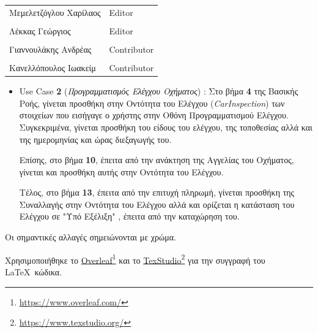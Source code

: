 \documentclass{../ol-softwaremanual}
\newcommand{\doclink}[2]{\href{#1}{#2}\footnote{\url{#1}}}
\begin{document}
	
	\vspace{20pt}
	
	\begin{table}[htbp!]
		\begin{tabular}{ll}
			Μεμελετζόγλου Χαρίλαος & \en Editor \\
			\\ Λέκκας Γεώργιος      &   \en  Editor \\
			\\ Γιαννουλάκης Ανδρέας & \en Contributor \\
			\\ Κανελλόπουλος Ιωακείμ & \en Contributor \\ 
		\end{tabular}
	\end{table}
	
	
	
	\flushleft
	
	\begin{itemize}		
		\item \en Use Case \textbf{2} \gr (\textit{Προγραμματισμός Ελέγχου Οχήματος}) : Στο βήμα \textbf{4} της Βασικής Ροής, γίνεται προσθήκη στην Οντότητα του Ελέγχου (\en\textit{CarInspection}\gr) των στοιχείων που εισήγαγε ο χρήστης στην Οθόνη Προγραμματισμού Ελέγχου. Συγκεκριμένα, γίνεται προσθήκη του είδους του ελέγχου, της τοποθεσίας αλλά και της ημερομηνίας και ώρας διεξαγωγής του.
		
		Επίσης, στο βήμα \textbf{10}, έπειτα από την ανάκτηση της Αγγελίας του Οχήματος, γίνεται και προσθήκη αυτής στην Οντότητα του Ελέγχου.
		
		Τέλος, στο βήμα \textbf{13}, έπειτα από την επιτυχή πληρωμή, γίνεται προσθήκη της Συναλλαγής στην Οντότητα του Ελέγχου αλλά και ορίζεται η κατάσταση του Ελέγχου σε \en"\gr Υπό Εξέλιξη\en" \gr, έπειτα από την καταχώρηση του.
		
	\end{itemize}
	
	
	\vspace{20pt}
	
	Οι σημαντικές αλλαγές σημειώνονται με  χρώμα.
	
	
	
	
	\newpage 
	
	\vspace{20pt}
	\flushleft
	Χρησιμοποιήθηκε το \en \doclink{https://www.overleaf.com/}{Overleaf} \gr και το \en \doclink{https://www.texstudio.org/}{TexStudio} \gr για την συγγραφή του \LaTeX\ κώδικα. \break
	
\end{document}
